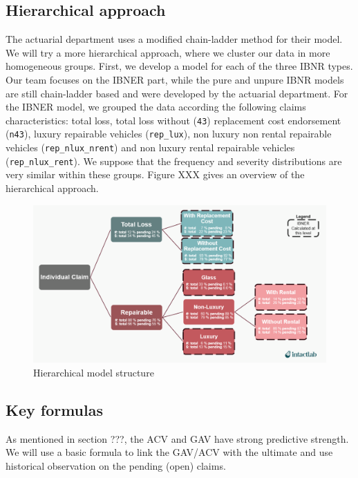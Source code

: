\subsection{Hierarchical approach}
	The actuarial department uses a modified chain-ladder method for their model. We will try a more hierarchical approach, where we cluster our data in more homogeneous groups. First, we develop a model for each of the three IBNR types. Our team focuses on the IBNER part, while the pure and unpure IBNR models are still chain-ladder based and were developed by the actuarial department. For the IBNER model, we grouped the data according the following claims characteristics:  total loss, total loss without (\texttt{43}) replacement cost endorsement (\texttt{n43}), luxury repairable vehicles (\texttt{rep\_lux}), non luxury non rental repairable vehicles (\texttt{rep\_nlux\_nrent}) and non luxury rental repairable vehicles (\texttt{rep\_nlux\_rent}). We suppose that the frequency and severity distributions are very similar within these groups. Figure XXX gives an overview of the hierarchical approach.
	\begin{figure}[H]
		\begin{center}
			\includegraphics[scale=0.4]{Graphiques/Hier_model} 
			\renewcommand{\figurename}{Figure}
			\caption{Hierarchical model structure}\label{Fig_hier_model}
		\end{center}
	\end{figure}
 
\subsection{Key formulas}
	As mentioned in section ???, the ACV and GAV have strong predictive strength. We will use a basic formula to link the GAV/ACV with the ultimate and use historical observation on the pending (open) claims.

